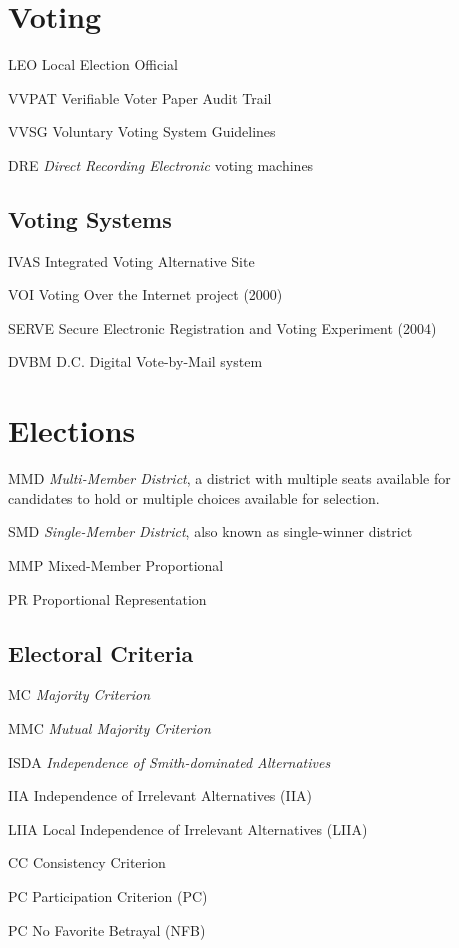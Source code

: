 \section*{Voting}
\begin{symbollist}
	\item[LEO] Local Election Official
	\item[VVPAT] Verifiable Voter Paper Audit Trail
	\item[VVSG] Voluntary Voting System Guidelines
	\item[DRE] \emph{Direct Recording Electronic} voting machines
\end{symbollist}

\subsection*{Voting Systems}
\begin{symbollist}
	\item[IVAS] Integrated Voting Alternative Site
	\item[VOI] Voting Over the Internet project (2000)
	\item[SERVE] Secure Electronic Registration and Voting Experiment (2004)
	\item[DVBM] D.C. Digital Vote-by-Mail system
\end{symbollist}

\section*{Elections}
\begin{symbollist}
	\item[MMD] \emph{Multi-Member District}, a district with multiple seats
		available for candidates to hold or multiple choices available for
		selection.
	\item[SMD] \emph{Single-Member District}, also known as single-winner district
	\item[MMP] Mixed-Member Proportional
	\item[PR] Proportional Representation
\end{symbollist}

\subsection*{Electoral Criteria}
\begin{symbollist}
	\item[MC] \emph{Majority Criterion}
	\item[MMC] \emph{Mutual Majority Criterion}
	\item[ISDA] \emph{Independence of Smith-dominated Alternatives}
	\item[IIA] Independence of Irrelevant Alternatives (IIA)
	\item[LIIA] Local Independence of Irrelevant Alternatives (LIIA)
	\item[CC] Consistency Criterion
	\item[PC] Participation Criterion (PC)
	\item[PC] No Favorite Betrayal (NFB)
\end{symbollist}

